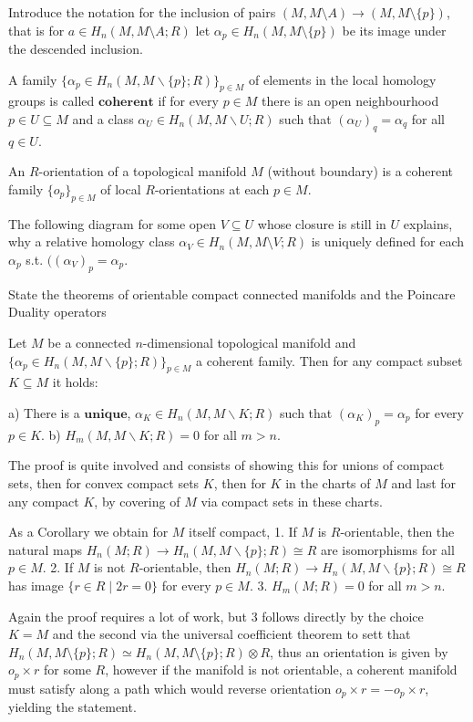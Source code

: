 Introduce the notation for the inclusion of pairs \( (M, M \setminus A) \to (M, M \setminus \{p\}) \), that is for \( a \in H_n(M, M \setminus A;R) \)
let \( \alpha_p \in H_n(M, M \setminus \{p\}) \) be its image under the descended inclusion.

A family \(\{ \alpha_p \in H_n(M, M \backslash \{p\}; R) \}_{p \in M}\) of elements in the local homology groups is called \(\textbf{coherent}\) 
if for every \(p \in M\) there is an open neighbourhood \(p \in U \subseteq M\) and a class \(\alpha_U \in H_n(M, M \backslash U; R)\) 
such that \((\alpha_U)_q = \alpha_q\) for all \(q \in U\).

An \( R \)-orientation of a topological manifold \( M \) (without boundary) is a coherent family \( \{o_p\}_{p \in M} \) of local \( R \)-orientations at each \( p \in M \).

The following diagram for some open \( V \subseteq U \) whose closure is still in \( U \) explains, why a relative homology class \( \alpha_V \in H_n(M, M\setminus V; R)\)
is uniquely defined for each \( \alpha_p \) s.t. \( ((\alpha_V)_{p} = \alpha_p \).



State the theorems of orientable compact connected manifolds and the Poincare Duality operators

Let \(M\) be a connected \(n\)-dimensional topological manifold and 
\(\{\alpha_p \in H_n(M, M \backslash \{p\}; R)\}_{p \in M}\) a coherent family. Then for any compact subset \(K \subseteq M\) it holds:

a) There is a \( \textbf{unique} \), \(\alpha_K \in H_n(M, M \backslash K; R)\) such that \((\alpha_K)_p = \alpha_p\) for every \(p \in K\).
b) \(H_m(M, M \backslash K; R) = 0\) for all \(m > n\).

The proof is quite involved and consists of showing this for unions of compact sets, then for convex compact sets \( K \), then
for \( K \) in the charts of \( M \) and last for any compact \( K \), by covering of \( M \) via compact sets in these charts.

As a Corollary we obtain for \( M \) itself compact,
1. If \(M\) is \(R\)-orientable, then the natural maps \(H_n(M; R) \to H_n(M, M \backslash \{p\}; R) \cong R\) are isomorphisms for all \(p \in M\).
2. If \(M\) is not \(R\)-orientable, then \(H_n(M; R) \to H_n(M, M \backslash \{p\}; R) \cong R\) has image \(\{r \in R \mid 2r = 0\}\) for every \(p \in M\).
3. \(H_m(M; R) = 0\) for all \(m > n\).

Again the proof requires a lot of work, but 3 follows directly by the choice \( K = M \) and the second via the universal coefficient theorem
to sett that \( H_n(M, M \setminus \{p\};R) \simeq H_n(M, M \setminus \{p\};R) \otimes R \), thus an orientation is given by \( o_p \times r \) for some \( R \),
however if the manifold is not orientable, a coherent manifold must satisfy along a path which would reverse orientation \( o_p \times r = - o_p \times r \), yielding the statement.


